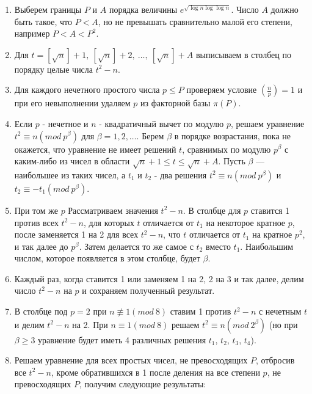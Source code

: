   \begin{enumerate}
    \item Выберем границы $P$ и $A$ порядка величины $e^{\sqrt{\log{n}\log{\log{n}}}}$. Число $A$ должно быть такое, что $P < A$, но не превышать 
      сравнительно малой его степени, например $P < A < P^2$.
    \item Для $t = [\sqrt{n}] + 1, \: [\sqrt{n}] + 2, \: \dots, \: [\sqrt{n}] + A$ выписываем в столбец по порядку целые числа $t^2 - n$.
    \item Для каждого нечетного простого числа $p \le P$ проверяем условие $\left( \frac{n}{p}\right) = 1$ и при его невыполнении удаляем $p$
     из факторной базы $\pi(P)$.
    \item Если $p$ - нечетное и $n$ - квадратичный вычет по модулю $p$, решаем уравнение $t^2 \equiv n(mod \: p^{\beta})$
      для $\beta = 1, 2, \dots$. Берем $\beta$ в порядке возрастания, пока не окажется, что уравнение не имеет решений $t$, сравнимых по модулю
      $p^{\beta}$ с каким-либо из чисел в области $\sqrt{n} + 1 \le t \le \sqrt{n} + A$. Пусть $\beta$ — наибольшее из таких чисел,
      а $t_1$ и $t_2$ - два решения $t^2 \equiv n(mod \: p^{\beta})$ и $t_2 \equiv -t_1 (mod \: p^{\beta})$.
    \item При том же $p$ Рассматриваем значения $t^2 - n$. В столбце для $p$ ставится 1 против всех $t^2 - n$, для которых $t$ отличается от $t_1$ 
      на некоторое кратное $p$, после заменяется 1 на 2 для всех $t^2 - n$, что $t$ отличается от $t_1$ на кратное $p^2$, и так далее до $p^{\beta}$.
      Затем делается то же самое с $t_2$ вместо $t_1$. Наибольшим числом, которое появляется в этом столбце, будет $\beta$.
    \item Каждый раз, когда ставится 1 или заменяем 1 на 2, 2 на 3 и так далее, делим число $t^2 - n$ на $p$ и сохраняем полученный результат.
    \item В столбце под $p = 2$ при $n \not\equiv 1 (mod \: 8)$ ставим 1 против $t^2 - n$ с нечетным $t$ и делим $t^2 - n$ на 2. 
      При $n \equiv 1 (mod \: 8)$ решаем $t^2 \equiv n (mod \: 2^{\beta})$ (но при $\beta \ge 3$ уравнение будет иметь 4 различных решения
      $t_1$, $t_2$, $t_3$, $t_4$).
    \item Решаем уравнение для всех простых чисел, не превосходящих $P$, отбросив все $t^2 - n$, кроме обратившихся в 1 после деления на
      все степени $p$, не превосходящих $P$, получим следующие результаты:


\end{enumerate}
